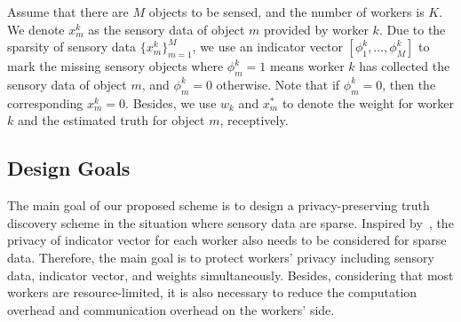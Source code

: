 \documentclass[conference]{IEEEtran}
\begin{document}
Assume that there are $M$ objects to be sensed, and the number of workers is $K$.
We denote $x_m^k$ as the sensory data of object $m$ provided by worker $k$.
Due to the sparsity of sensory data $\{x_m^k\}_{m=1}^M$, we use an indicator vector $[\phi_1^k, \ldots, \phi_M^k]$ to mark the missing sensory objects where $\phi_m^k = 1$ means worker $k$ has collected the sensory data of object $m$, and $\phi_m^k = 0$ otherwise.
Note that if $\phi_m^k = 0$, then the corresponding $x_m^k = 0$.
Besides, we use $w_k$ and $x_m^*$ to denote the weight for worker $k$ and the estimated truth for object $m$, receptively.

\subsection{Design Goals}
The main goal of our proposed scheme is to design a privacy-preserving truth discovery scheme in the situation where sensory data are sparse.
Inspired by~\cite{wang_sparse_2020}, the privacy of indicator vector for each worker also needs to be considered for sparse data.
Therefore, the main goal is to protect workers' privacy including sensory data, indicator vector, and weights simultaneously.
Besides, considering that most workers are resource-limited, it is also necessary to reduce the computation overhead and communication overhead on the workers' side.
\end{document}
